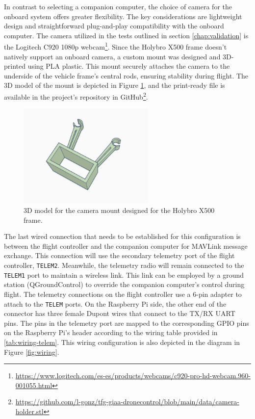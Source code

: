 In contrast to selecting a companion computer, the choice of camera for the onboard system offers greater flexibility. The key considerations are lightweight design and straightforward plug-and-play compatibility with the onboard computer. The camera utilized in the tests outlined in section \ref{chap:validation} is the Logitech C920 1080p webcam\footnote{\url{https://www.logitech.com/es-es/products/webcams/c920-pro-hd-webcam.960-001055.html}}. Since the Holybro X500 frame doesn't natively support an onboard camera, a custom mount was designed and 3D-printed using PLA plastic. This mount securely attaches the camera to the underside of the vehicle frame's central rods, ensuring stability during flight. The 3D model of the mount is depicted in Figure \ref{fig:camera-holder-3d}, and the print-ready file is available in the project's repository in GitHub\footnote{\url{https://github.com/l-gonz/tfg-giaa-dronecontrol/blob/main/data/camera-holder.stl}}.

\begin{figure}
  \centering
  \includegraphics[width=0.6\textwidth, keepaspectratio]{img/cam-holder.jpg}
  \caption{3D model for the camera mount designed for the Holybro X500 frame.}
  \label{fig:camera-holder-3d}
\end{figure}

The last wired connection that needs to be established for this configuration is between the flight controller and the companion computer for MAVLink message exchange.
This connection will use the secondary telemetry port of the flight controller, \texttt{TELEM2}.
Meanwhile, the telemetry radio will remain connected to the \texttt{TELEM1} port to maintain a wireless link.
This link can be employed by a ground station (QGroundControl) to override the companion computer's control during flight.
The telemetry connections on the flight controller use a 6-pin adapter to attach to the \texttt{TELEM} ports.
On the Raspberry Pi side, the other end of the connector has three female Dupont wires that connect to the TX/RX UART pins. The pins in the telemetry port are mapped to the corresponding GPIO pins on the Raspberry Pi's header according to the wiring table provided in \ref{tab:wiring-telem}.
This wiring configuration is also depicted in the diagram in Figure \ref{fig:wiring}.

